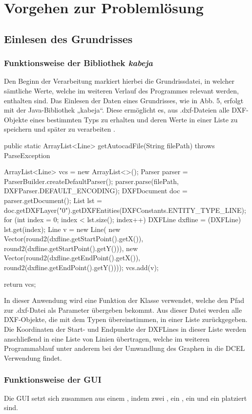 \chapter{Vorgehen zur Problemlösung}
\section{Einlesen des Grundrisses}

\subsection{Funktionsweise der Bibliothek \textit{kabeja}}
Den Beginn der Verarbeitung markiert hierbei die Grundrissdatei, in welcher sämtliche Werte, welche im weiteren Verlauf des Programmes relevant werden, enthalten sind.
Das Einlesen der Daten eines Grundrisses, wie in Abb. 5, erfolgt mit der Java-Bibliothek „kabeja“. 
Diese ermöglicht es, aus .dxf-Dateien alle DXF-Objekte eines bestimmten Typs zu erhalten und deren Werte in einer Liste zu speichern und später zu verarbeiten \cite{kabeja}.
\begin{code}
public static ArrayList<Line> getAutocadFile(String filePath) throws ParseException {
	ArrayList<Line> vcs = new ArrayList<>();
	Parser parser = ParserBuilder.createDefaultParser();
	parser.parse(filePath, DXFParser.DEFAULT_ENCODING);
	DXFDocument doc = parser.getDocument();
	List lst = doc.getDXFLayer("0").getDXFEntities(DXFConstants.ENTITY_TYPE_LINE);
	for (int index = 0; index < lst.size(); index++) {
		DXFLine dxfline = (DXFLine) lst.get(index);
		Line v = new Line(
		new Vector(round2(dxfline.getStartPoint().getX()), round2(dxfline.getStartPoint().getY())),
		new Vector(round2(dxfline.getEndPoint().getX()), round2(dxfline.getEndPoint().getY())));
		vcs.add(v);
	}
	
	return vcs;
}
\end{code}
In dieser Anwendung wird eine Funktion der Klasse  verwendet, welche den Pfad zur .dxf-Datei als Parameter übergeben bekommt. 
Aus dieser Datei werden alle DXF-Objekte, die mit dem Typen  übereinstimmen, in einer Liste zurückgegeben. 
Die Koordinaten der Start- und Endpunkte der DXFLines  in dieser Liste werden anschließend in eine Liste von Linien übertragen, welche im weiteren Programmablauf unter anderem bei der Umwandlung des Graphen in die DCEL Verwendung findet.

\subsection{Funktionsweise der GUI}
Die GUI setzt sich zusammen aus einem , indem zwei , ein , ein  und ein  platziert sind.

